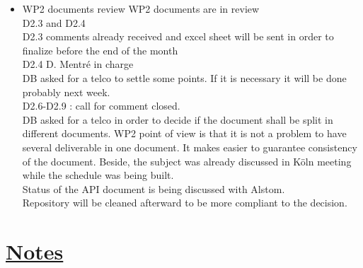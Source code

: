 \documentclass[a4paper, 11pt]{article}
\begin{document}
\begin{itemize}
\item WP2 documents review
WP2 documents are in review\\
D2.3 and D2.4\\
D2.3 comments already received and excel sheet will be sent in order to finalize before the end of the month\\
D2.4 D. Mentr\'e in charge\\
DB asked for a telco to settle some points. If it is necessary it will be done probably next week.\\

D2.6-D2.9 : call for comment closed.\\
DB asked for a telco in order to decide if the document shall be split in different documents. WP2 point of view is that it is not a problem to have several deliverable in one document. It makes easier to guarantee consistency of the document. Beside, the subject was already discussed in K\"oln meeting while the schedule was being built.\\
Status of the API document is being discussed with Alstom.\\
Repository will be cleaned afterward to be more compliant to the decision.
\end{itemize}

\section{\underline{Notes}}
\end{document}
